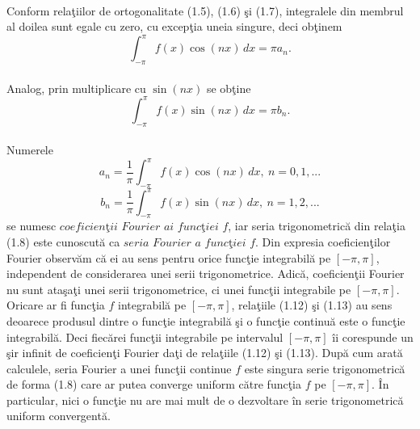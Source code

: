 \documentclass[a4paper,openany,12pt]{report}
\begin{document}
\paragraph*{}Conform rela\c tiilor de ortogonalitate (1.5), (1.6) \c si (1.7), integralele din membrul al doilea sunt egale cu zero, cu excep\c tia uneia singure, deci ob\c tinem
\begin{equation*}
\int_{-\pi}^\pi f(x)\cos(nx)\,dx = \pi a_n.
\end{equation*}
\paragraph*{}Analog, prin multiplicare cu $\sin(nx)$ se ob\c tine
\begin{equation*}
 \int_{-\pi}^\pi f(x)\sin(nx)\,dx = \pi b_n.
\end{equation*}
\paragraph*{}Numerele
\begin{equation}
 a_n = \frac{1}{\pi}\int_{-\pi}^\pi f(x)\cos(nx)\,dx,\: n = 0, 1, ...
\end{equation}
\begin{equation}
 b_n =\frac{1}{\pi} \int_{-\pi}^\pi f(x)\sin(nx)\,dx, \: n = 1, 2, ...
\end{equation}
se numesc $\textit {coeficien\c tii Fourier ai func\c tiei f}$, iar seria trigonometric\u a din rela\c tia (1.8) este cunoscut\u a ca $\textit {seria Fourier a func\c tiei f}$. Din expresia coeficien\c tilor Fourier observ\u am c\u a ei au sens pentru orice func\c tie integrabil\u a pe $[-\pi, \pi]$, independent de considerarea unei serii trigonometrice. Adic\u a, coeficien\c tii Fourier nu sunt ata\c sa\c ti unei serii trigonometrice, ci unei func\c tii integrabile pe $[-\pi, \pi]$. Oricare ar fi func\c tia $f$ integrabil\u a pe $[-\pi, \pi]$, rela\c tiile (1.12) \c si (1.13) au sens deoarece produsul dintre o func\c tie integrabil\u a \c si o func\c tie continu\u a este o func\c tie integrabil\u a. Deci fiec\u arei func\c tii integrabile pe intervalul $[-\pi, \pi]$ \^ ii corespunde un \c sir infinit de coeficien\c ti Fourier da\c ti de rela\c tiile (1.12) \c si (1.13). Dup\u a cum arat\u a calculele, seria Fourier a unei func\c tii continue $f$ este singura serie trigonometric\u a de forma (1.8) care ar putea converge uniform c\u atre func\c tia $f$ pe $[-\pi, \pi]$. \^ In particular, nici o func\c tie nu are mai mult de o dezvoltare \^ in serie trigonometric\u a uniform convergent\u a. 
\end{document}
